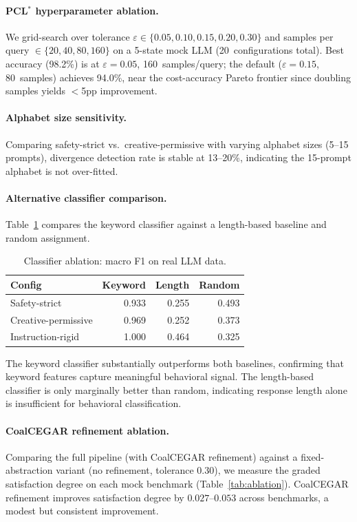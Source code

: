 \documentclass[11pt]{article}
\begin{document}
\paragraph{PCL$^*$ hyperparameter ablation.}
We grid-search over tolerance $\varepsilon \in \{0.05, 0.10, 0.15,
0.20, 0.30\}$ and samples per query $\in \{20, 40, 80, 160\}$ on a
5-state mock LLM (20~configurations total).  Best accuracy (98.2\%)
is at $\varepsilon = 0.05$, 160~samples/query; the default
($\varepsilon = 0.15$, 80~samples) achieves 94.0\%, near the
cost-accuracy Pareto frontier since doubling samples yields $<$5pp
improvement.

\paragraph{Alphabet size sensitivity.}
Comparing safety-strict vs.\ creative-permissive with varying
alphabet sizes (5--15 prompts), divergence detection rate is stable
at 13--20\%, indicating the 15-prompt alphabet is not over-fitted.

\paragraph{Alternative classifier comparison.}
Table~\ref{tab:classifier-ablation} compares the keyword classifier
against a length-based baseline and random assignment.

\begin{table}[t]
\centering
\caption{Classifier ablation: macro F1 on real LLM data.}
\label{tab:classifier-ablation}
\small
\begin{tabular}{@{}lrrr@{}}
\toprule
\textbf{Config} & \textbf{Keyword} & \textbf{Length} & \textbf{Random} \\
\midrule
Safety-strict       & 0.933 & 0.255 & 0.493 \\
Creative-permissive & 0.969 & 0.252 & 0.373 \\
Instruction-rigid   & 1.000 & 0.464 & 0.325 \\
\bottomrule
\end{tabular}
\end{table}

The keyword classifier substantially outperforms both baselines,
confirming that keyword features capture meaningful behavioral
signal.  The length-based classifier is only marginally better
than random, indicating response length alone is insufficient
for behavioral classification.

\paragraph{CoalCEGAR refinement ablation.}
Comparing the full pipeline (with CoalCEGAR refinement) against a
fixed-abstraction variant (no refinement, tolerance $0.30$), we
measure the graded satisfaction degree on each mock benchmark
(Table~\ref{tab:ablation}).  CoalCEGAR refinement improves
satisfaction degree by $0.027$--$0.053$ across benchmarks, a
modest but consistent improvement.
\end{document}
